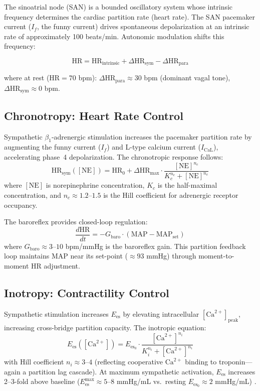 \documentclass[10pt,twocolumn,a4paper]{article}
\theoremstyle{remark}
\newcommand{\Ees}{E_{\mathrm{es}}}
\newcommand{\HR}{\mathrm{HR}}
\newcommand{\MAP}{\mathrm{MAP}}
\begin{document}
The sinoatrial node (SAN) is a bounded oscillatory system \cite{sachikonye2024cardio} whose intrinsic frequency determines the cardiac partition rate (heart rate). The SAN pacemaker current ($I_f$, the funny current) drives spontaneous depolarization at an intrinsic rate of approximately 100 beats/min. Autonomic modulation shifts this frequency:

\begin{equation}
    \HR = \HR_{\mathrm{intrinsic}} + \Delta\HR_{\mathrm{sym}} - \Delta\HR_{\mathrm{para}}
    \label{eq:HR_autonomic}
\end{equation}

\noindent
where at rest ($\HR = 70$ bpm): $\Delta\HR_{\mathrm{para}} \approx 30$ bpm (dominant vagal tone), $\Delta\HR_{\mathrm{sym}} \approx 0$ bpm.

\subsection{Chronotropy: Heart Rate Control}

Sympathetic $\beta_1$-adrenergic stimulation increases the pacemaker partition rate by augmenting the funny current ($I_f$) and L-type calcium current ($I_{\mathrm{CaL}}$), accelerating phase~4 depolarization. The chronotropic response follows:
\begin{equation}
    \HR_{\mathrm{sym}}([\mathrm{NE}]) = \HR_0 + \Delta\HR_{\max} \cdot \frac{[\mathrm{NE}]^{n_c}}{K_c^{n_c} + [\mathrm{NE}]^{n_c}}
    \label{eq:chronotropy}
\end{equation}
where $[\mathrm{NE}]$ is norepinephrine concentration, $K_c$ is the half-maximal concentration, and $n_c \approx 1.2$--$1.5$ is the Hill coefficient for adrenergic receptor occupancy.

The baroreflex provides closed-loop regulation:
\begin{equation}
    \frac{d\HR}{dt} = -G_{\mathrm{baro}} \cdot (\MAP - \MAP_{\mathrm{set}})
    \label{eq:baroreflex_HR}
\end{equation}
where $G_{\mathrm{baro}} \approx 3$--$10$ bpm/mmHg is the baroreflex gain. This partition feedback loop maintains MAP near its set-point ($\approx 93$ mmHg) through moment-to-moment HR adjustment.

\subsection{Inotropy: Contractility Control}

Sympathetic stimulation increases $\Ees$ by elevating intracellular $[\mathrm{Ca}^{2+}]_{\mathrm{peak}}$, increasing cross-bridge partition capacity. The inotropic equation:
\begin{equation}
    \Ees([\mathrm{Ca}^{2+}]) = \Ees_0 \cdot \frac{[\mathrm{Ca}^{2+}]^{n_i}}{K_i^{n_i} + [\mathrm{Ca}^{2+}]^{n_i}}
    \label{eq:inotropy}
\end{equation}
with Hill coefficient $n_i \approx 3$--$4$ (reflecting cooperative $\mathrm{Ca}^{2+}$ binding to troponin—again a partition lag cascade). At maximum sympathetic activation, $\Ees$ increases 2--3-fold above baseline ($\Ees^{\max} \approx 5$--$8$ mmHg/mL vs.\ resting $\Ees_0 \approx 2$ mmHg/mL) \cite{sagawa1988cardiac}.
\end{document}

